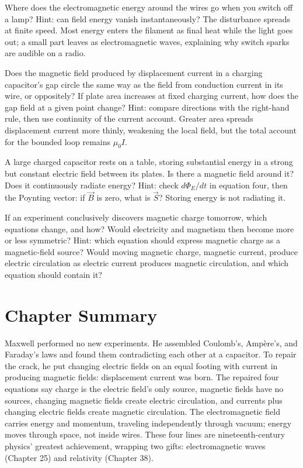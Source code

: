 \begin{puzzles}
\item Where does the electromagnetic energy around the wires go when you switch off a lamp? Hint: can field energy vanish instantaneously? The disturbance spreads at finite speed. Most energy enters the filament as final heat while the light goes out; a small part leaves as electromagnetic waves, explaining why switch sparks are audible on a radio.
\item Does the magnetic field produced by displacement current in a charging capacitor's gap circle the same way as the field from conduction current in its wire, or oppositely? If plate area increases at fixed charging current, how does the gap field at a given point change? Hint: compare directions with the right-hand rule, then use continuity of the current account. Greater area spreads displacement current more thinly, weakening the local field, but the total account for the bounded loop remains \(\mu_0 I\).
\item A large charged capacitor rests on a table, storing substantial energy in a strong but constant electric field between its plates. Is there a magnetic field around it? Does it continuously radiate energy? Hint: check \(d\varPhi_E/dt\) in equation four, then the Poynting vector: if \(\vec B\) is zero, what is \(\vec S\)? Storing energy is not radiating it.
\item If an experiment conclusively discovers magnetic charge tomorrow, which equations change, and how? Would electricity and magnetism then become more or less symmetric? Hint: which equation should express magnetic charge as a magnetic-field source? Would moving magnetic charge, magnetic current, produce electric circulation as electric current produces magnetic circulation, and which equation should contain it?
\end{puzzles}

\section*{Chapter Summary}

Maxwell performed no new experiments. He assembled Coulomb's, Ampère's, and Faraday's laws and found them contradicting each other at a capacitor. To repair the crack, he put changing electric fields on an equal footing with current in producing magnetic fields: displacement current was born. The repaired four equations say charge is the electric field's only source, magnetic fields have no sources, changing magnetic fields create electric circulation, and currents plus changing electric fields create magnetic circulation. The electromagnetic field carries energy and momentum, traveling independently through vacuum; energy moves through space, not inside wires. These four lines are nineteenth-century physics' greatest achievement, wrapping two gifts: electromagnetic waves (Chapter 25) and relativity (Chapter 38).
